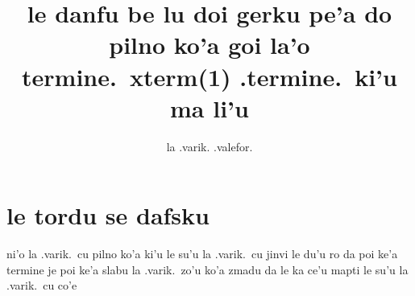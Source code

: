 \documentclass{article}
\title{le danfu be lu doi gerku pe'a do pilno ko'a goi la'o termine.\ xterm(1) .termine.\ ki'u ma li'u}
\author{la .varik. .valefor.}
\begin{document}
\maketitle

\section{le tordu se dafsku}
ni'o la .varik.\ cu pilno ko'a ki'u le su'u la .varik.\ cu jinvi le du'u ro da poi ke'a termine je poi ke'a slabu la .varik.\ zo'u ko'a zmadu da le ka ce'u mapti le su'u la .varik.\ cu co'e
\end{document}
